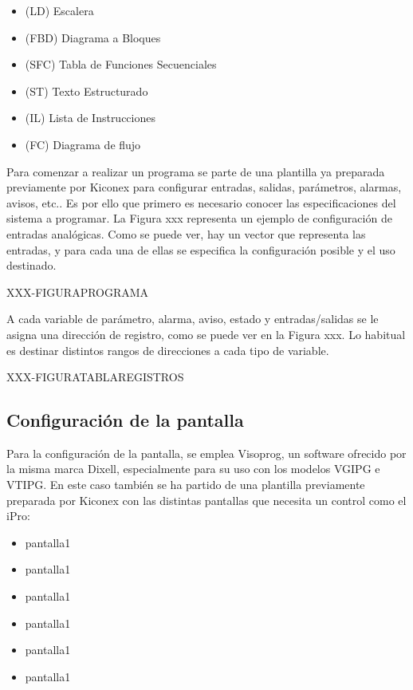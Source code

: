 \begin{itemize}
  \item (LD) Escalera  
  \item (FBD) Diagrama a Bloques 
  \item (SFC) Tabla de Funciones Secuenciales 
  \item (ST) Texto Estructurado 
  \item (IL) Lista de Instrucciones 
  \item (FC) Diagrama de flujo 
\end{itemize}

Para comenzar a realizar un programa se parte de una plantilla ya preparada previamente por Kiconex para configurar entradas, salidas, parámetros, alarmas, avisos, etc.. Es por ello que primero es necesario conocer las especificaciones del sistema a programar. La Figura xxx representa un ejemplo de configuración de entradas analógicas. Como se puede ver, hay un vector que representa las entradas, y para cada una de ellas se especifica la configuración posible y el uso destinado.

XXX-FIGURAPROGRAMA

A cada variable de parámetro, alarma, aviso, estado y entradas/salidas se le asigna una dirección de registro, como se puede ver en la Figura xxx. Lo habitual es destinar distintos rangos de direcciones a cada tipo de variable.

XXX-FIGURATABLAREGISTROS

\subsection{Configuración de la pantalla}
\label{subsec:displayconfig}

Para la configuración de la pantalla, se emplea Visoprog, un software ofrecido por la misma marca Dixell, especialmente para su uso con los modelos VGIPG e VTIPG. En este caso también se ha partido de una plantilla previamente preparada por Kiconex con las distintas pantallas que necesita un control como el iPro:

\begin{itemize}
  \item pantalla1  
  \item pantalla1 
  \item pantalla1
  \item pantalla1 
  \item pantalla1 
  \item pantalla1 
\end{itemize}


